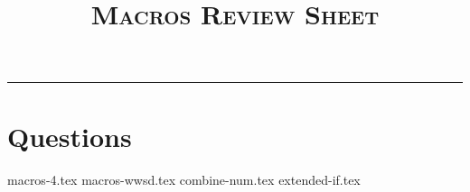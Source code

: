 \documentclass{exam}
\title{\textsc{Macros Review Sheet}}
\begin{document}
\maketitle
\rule{\textwidth}{0.15em}
\fontsize{12}{15}\selectfont

\section{Questions}
\begin{questions}
{macros-4.tex}
\newpage
{macros-wwsd.tex}
\newpage
{combine-num.tex}
\newpage
{extended-if.tex}
\end{questions}
\end{document}
